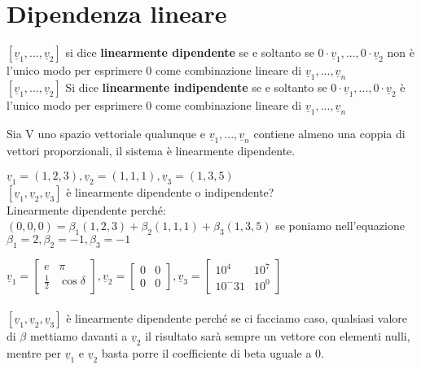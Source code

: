 \section{Dipendenza lineare}
$[\underline{v}_1,...,\underline{v}_2]$ si dice \textbf{linearmente dipendente} se e soltanto se $0\cdot \underline{v}_1,...,0\cdot \underline{v}_2$ non è l'unico modo per esprimere 0 come combinazione lineare di $\underline{v}_1,...,\underline{v}_n$\\
$[\underline{v}_1,...,\underline{v}_2]$ Si dice \textbf{linearmente indipendente} se e soltanto se $0\cdot \underline{v}_1,...,0\cdot \underline{v}_2$ è l'unico modo per esprimere 0 come combinazione lineare di $\underline{v}_1,...,\underline{v}_n$
\begin{proposizione}
	Sia V uno spazio vettoriale qualunque e $\underline{v}_1,...,\underline{v}_n$ contiene almeno una coppia di vettori proporzionali, il sistema è linearmente dipendente.
\end{proposizione}

\begin{es}
	$\underline{v}_1=(1,2,3),\underline{v}_2=(1,1,1),\underline{v}_3=(1,3,5)$\\
	$[\underline{v}_1,\underline{v}_2,\underline{v}_3]$ è linearmente dipendente o indipendente?\\
	Linearmente dipendente perché: $(0,0,0)=\beta_1(1,2,3)+\beta_2(1,1,1)+\beta_3(1,3,5)$ se poniamo nell'equazione $\beta_1=2,\beta_2=-1,\beta_3=-1$
\end{es}

\begin{es}
	$\underline{v}_1=\begin{bmatrix}
		e           & \pi\\
		\frac{1}{2} & \cos \delta
	\end{bmatrix}, \underline{v}_2=\begin{bmatrix}
		0 & 0\\
		0 & 0
	\end{bmatrix}, \underline{v}_3=\begin{bmatrix}
		10^4   & 10^7\\
		10^-31 & 10^0
	\end{bmatrix}$\\\\
	$[\underline{v}_1,\underline{v}_2,\underline{v}_3]$ è linearmente dipendente perché se ci facciamo caso, qualsiasi valore di $\beta$ mettiamo davanti a $\underline{v}_2$ il risultato sarà sempre un vettore con elementi nulli, mentre per $\underline{v}_1$ e $\underline{v}_2$ basta porre il coefficiente di beta uguale a 0.
\end{es}

